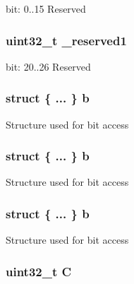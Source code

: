 bit\-: 0..15 Reserved \hypertarget{union_a_p_s_r___type_a959a73d8faee56599b7e792a7c5a2d16}{
\subsubsection[{\-\_\-reserved1}]{\setlength{\rightskip}{0pt plus 5cm}uint32\-\_\-t \-\_\-reserved1}}\label{union_a_p_s_r___type_a959a73d8faee56599b7e792a7c5a2d16}
bit\-: 20..26 Reserved \hypertarget{union_a_p_s_r___type_a2e5b85cff450c7f92c7388dd09f10065}{
\subsubsection[{b}]{\setlength{\rightskip}{0pt plus 5cm}struct \{ ... \}   b}}\label{union_a_p_s_r___type_a2e5b85cff450c7f92c7388dd09f10065}
Structure used for bit access \hypertarget{union_a_p_s_r___type_a398a87eafed8dea4e666d03278e69b74}{
\subsubsection[{b}]{\setlength{\rightskip}{0pt plus 5cm}struct \{ ... \}   b}}\label{union_a_p_s_r___type_a398a87eafed8dea4e666d03278e69b74}
Structure used for bit access \hypertarget{union_a_p_s_r___type_a1611cae6e74a7581fbca5c223e7290c9}{
\subsubsection[{b}]{\setlength{\rightskip}{0pt plus 5cm}struct \{ ... \}   b}}\label{union_a_p_s_r___type_a1611cae6e74a7581fbca5c223e7290c9}
Structure used for bit access \hypertarget{union_a_p_s_r___type_a7a1caf92f32fe9ebd8d1fe89b06c7776}{
\subsubsection[{C}]{\setlength{\rightskip}{0pt plus 5cm}uint32\-\_\-t C}}\label{union_a_p_s_r___type_a7a1caf92f32fe9ebd8d1fe89b06c7776}
